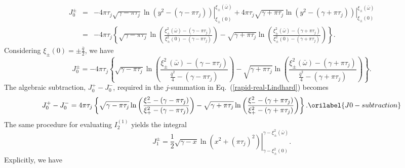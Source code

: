 \documentclass[aps,showkeys,noshowpacs,superscriptaddress,pre,preprint]{revtex4-2}
\let\label\orilabel
\begin{document}
\begin{eqnarray*}
J_0^{\pm} &=& 
\left.  - 4 \pi \tau_j \sqrt{\gamma - \pi \tau_j} \ln\left( y^2 - \left( \gamma - \pi \tau_j \right) \right) 
\right\vert_{ \xi_\pm\left( 0 \right) }^{\xi_\pm \left( \bar{\omega} \right)}
+ \left. 4 \pi \tau_j \sqrt{\gamma + \pi \tau_j} \ln\left( y^2 - \left( \gamma + \pi \tau_j \right) \right) 
\right\vert_{ \xi_\pm\left( 0 \right) }^{\xi_\pm \left( \bar{\omega} \right)} 
\\
&=& -4 \pi \tau_j \left\{
\sqrt{\gamma - \pi \tau_j} \ln\left( 
\frac{\xi_\pm^2\left( \bar{\omega} \right) - \left( \gamma - \pi \tau_j \right)}{
\xi_\pm^2\left( 0 \right) - \left( \gamma - \pi \tau_j \right)}
\right) 
- \sqrt{\gamma + \pi \tau_j} \ln\left( 
\frac{\xi_\pm^2\left( \bar{\omega} \right) - \left( \gamma + \pi \tau_j \right)}{
\xi_\pm^2\left( 0 \right) - \left( \gamma + \pi \tau_j \right)}
\right) 
\right\} .
\end{eqnarray*}
Considering $\xi_\pm\left( 0 \right) = \pm \frac{\bar{q}}{2}$, we have
\begin{equation}
J_0^{\pm} =
-4 \pi \tau_j \left\{
\sqrt{\gamma - \pi \tau_j} \ln\left( 
\frac{\xi_\pm^2\left( \bar{\omega} \right) - \left( \gamma - \pi \tau_j \right)}{
\frac{\bar{q}^2}{4} - \left( \gamma - \pi \tau_j \right)}
\right) 
- \sqrt{\gamma + \pi \tau_j} \ln\left( 
\frac{\xi_\pm^2\left( \bar{\omega} \right) - \left( \gamma + \pi \tau_j \right)}{
\frac{\bar{q}^2}{4} - \left( \gamma + \pi \tau_j \right)}
\right) 
\right\} .
\end{equation}
The algebraic subtraction, $J_0^+ - J_0^-$, 
required in the $j$-summation in Eq.~(\ref{rapid-real-Lindhard}) becomes
\begin{equation}
J_0^+ - J_0^- =
4\pi\tau_j \left\{ 
\sqrt{\gamma - \pi \tau_j} 
\ln\left( \frac{\xi_-^2 - \left( \gamma - \pi \tau_j \right)}{
\xi_+^2 - \left( \gamma - \pi \tau_j \right)}
\right)
- \sqrt{\gamma + \pi \tau_j} 
\ln\left( \frac{\xi_-^2 - \left( \gamma + \pi \tau_j \right)}{
\xi_+^2 - \left( \gamma + \pi \tau_j \right)}
\right)
\right\} .
\label{J0-subtraction}
\end{equation}
The same procedure for evaluating $I_2^{(1)}$ yields the integral
\begin{equation*}
J_1^{\pm} = \left. \frac{1}{2} \sqrt{\gamma - x} 
\ln\left( x^2 + \left( \pi \tau_j \right)^2 \right) 
\right\vert_{\gamma -\xi_{\pm}^2 \left( 0 \right)}^{\gamma - \xi_{\pm}^2 \left( \bar{\omega} \right)} .
\end{equation*}
Explicitly, we have
\end{document}
